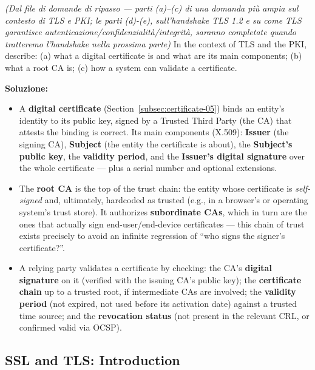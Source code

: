 \documentclass[12pt, a4paper]{article}
\newcounter{esercizio}[section]
\begin{document}
\begin{tcolorbox}[colback=lightergray!10, colframe=tocsec, title=\textbf{Esercizio \theesercizio}]
\textit{(Dal file di domande di ripasso --- parti (a)--(c) di una domanda più ampia sul contesto di TLS e PKI; le parti (d)-(e), sull'handshake TLS 1.2 e su come TLS garantisce autenticazione/confidenzialità/integrità, saranno completate quando tratteremo l'handshake nella prossima parte)} In the context of TLS and the PKI, describe: (a) what a digital certificate is and what are its main components; (b) what a root CA is; (c) how a system can validate a certificate.
\end{tcolorbox}

\textbf{Soluzione:}
\begin{itemize}
    \item[(a)] A \textbf{digital certificate} (Section~\ref{subsec:certificate-05}) binds an entity's identity to its public key, signed by a Trusted Third Party (the CA) that attests the binding is correct. Its main components (X.509): \textbf{Issuer} (the signing CA), \textbf{Subject} (the entity the certificate is about), the \textbf{Subject's public key}, the \textbf{validity period}, and the \textbf{Issuer's digital signature} over the whole certificate --- plus a serial number and optional extensions.
    \item[(b)] The \textbf{root CA} is the top of the trust chain: the entity whose certificate is \emph{self-signed} and, ultimately, hardcoded as trusted (e.g., in a browser's or operating system's trust store). It authorizes \textbf{subordinate CAs}, which in turn are the ones that actually sign end-user/end-device certificates --- this chain of trust exists precisely to avoid an infinite regression of ``who signs the signer's certificate?''.
    \item[(c)] A relying party validates a certificate by checking: the CA's \textbf{digital signature} on it (verified with the issuing CA's public key); the \textbf{certificate chain} up to a trusted root, if intermediate CAs are involved; the \textbf{validity period} (not expired, not used before its activation date) against a trusted time source; and the \textbf{revocation status} (not present in the relevant CRL, or confirmed valid via OCSP).
\end{itemize}


\subsection{SSL and TLS: Introduction}
\end{document}
